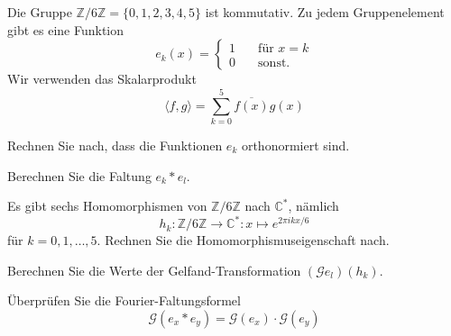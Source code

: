 Die Gruppe $\mathbb{Z}/6\mathbb{Z} = \{0,1,2,3,4,5\}$  
ist kommutativ.
Zu jedem Gruppenelement gibt es eine Funktion
\[
e_k(x)
=
\begin{cases}
1&\quad\text{für $x=k$}\\
0&\quad\text{sonst.}
\end{cases}
\]
Wir verwenden das Skalarprodukt
\[
\langle f,g\rangle
=
\sum_{k=0}^5 \overline{f(x)} g(x)
\]

\begin{teilaufgaben}
\item
Rechnen Sie nach, dass die Funktionen $e_k$ orthonormiert sind.
\item
Berechnen Sie die Faltung $e_k*e_l$.
\item
Es gibt sechs Homomorphismen von $\mathbb{Z}/6\mathbb{Z}$ nach $\mathbb{C}^*$,
nämlich
\[
h_k
\colon
\mathbb{Z}/6\mathbb{Z} \to \mathbb{C}^*
:
x\mapsto e^{2\pi ikx/6}
\]
für $k=0,1,\dots,5$.
Rechnen Sie die Homomorphismuseigenschaft nach.
\item
Berechnen Sie die Werte der Gelfand-Transformation
$(\mathscr{G}e_l)(h_k)$.
\item
Überprüfen Sie die Fourier-Faltungsformel
\begin{equation}
\mathscr{G}(e_x*e_y)
=
\mathscr{G}(e_x)\cdot\mathscr{G}(e_y)
\label{buch:gruppen:301:gelfand-produkt}
\end{equation}
\end{teilaufgaben}

